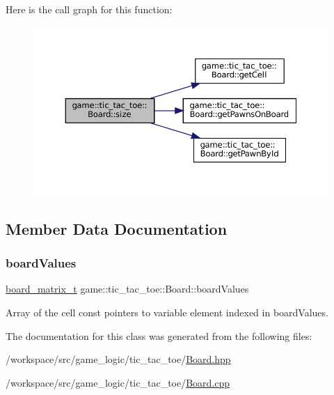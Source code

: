 Here is the call graph for this function\+:
\nopagebreak
\begin{figure}[H]
\begin{center}
\leavevmode
\includegraphics[width=350pt]{classgame_1_1tic__tac__toe_1_1_board_ac9d2d5da2263bb6166f93eec382380db_cgraph}
\end{center}
\end{figure}


\subsection{Member Data Documentation}
\mbox{\label{classgame_1_1tic__tac__toe_1_1_board_a56dbed9e12d5e8aa2db2526669201c58}} 
\subsubsection{\texorpdfstring{board\+Values}{boardValues}}
{\footnotesize\ttfamily \hyperlink{namespacegame_1_1tic__tac__toe_a58fc706fe9ae58c6e9045f6927230232}{board\+\_\+matrix\+\_\+t} game\+::tic\+\_\+tac\+\_\+toe\+::\+Board\+::board\+Values\hspace{0.3cm}{\ttfamily [protected]}}



Array of the cell const pointers to variable element indexed in board\+Values. 



The documentation for this class was generated from the following files\+:\begin{DoxyCompactItemize}
\item 
/workspace/src/game\+\_\+logic/tic\+\_\+tac\+\_\+toe/\hyperlink{tic__tac__toe_2_board_8hpp}{Board.\+hpp}\item 
/workspace/src/game\+\_\+logic/tic\+\_\+tac\+\_\+toe/\hyperlink{tic__tac__toe_2_board_8cpp}{Board.\+cpp}\end{DoxyCompactItemize}

